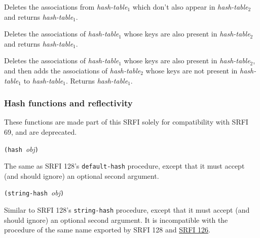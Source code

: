 \begin{entry}{%
  }

  Deletes the associations from \emph{hash-table$_1$} which don't also
  appear in \emph{hash-table$_2$} and returns \emph{hash-table$_1$}.
\end{entry}

\begin{entry}{%
  }

  Deletes the associations of \emph{hash-table$_1$} whose keys are
  also present in \emph{hash-table$_2$} and returns
  \emph{hash-table$_1$}.
\end{entry}

\begin{entry}{%
  }

  Deletes the associations of \emph{hash-table$_1$} whose keys are
  also present in \emph{hash-table$_2$}, and then adds the
  associations of \emph{hash-table$_2$} whose keys are not present in
  \emph{hash-table$_1$} to \emph{hash-table$_1$}. Returns
  \emph{hash-table$_1$}.
\end{entry}

\subsubsection{Hash functions and
reflectivity}\label{Hashfunctionsandreflectivity}


These functions are made part of this SRFI solely for compatibility with
SRFI 69, and are deprecated.

\texttt{(hash\ }\emph{obj}\texttt{)}

The same as SRFI 128's \texttt{default-hash} procedure, except that it
must accept (and should ignore) an optional second argument.

\texttt{(string-hash\ }\emph{obj}\texttt{)}

Similar to SRFI 128's \texttt{string-hash} procedure, except that it
must accept (and should ignore) an optional second argument. It is
incompatible with the procedure of the same name exported by SRFI 128
and \href{http://srfi.schemers.org/srfi-126/srfi-126.html}{SRFI 126}.

